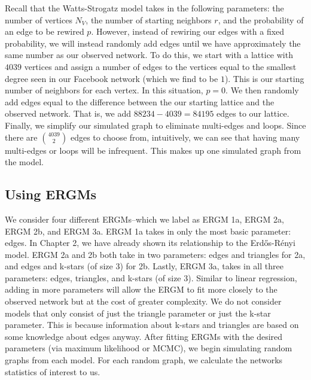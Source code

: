 \documentclass[12pt,twoside]{amherstthesis}
\begin{document}
  Recall that the Watts-Strogatz model takes in the following parameters:
  the number of vertices \(N_{V}\), the number of starting neighbors
  \(r\), and the probability of an edge to be rewired \(p\). However,
  instead of rewiring our edges with a fixed probability, we will instead
  randomly add edges until we have approximately the same number as our
  observed network. To do this, we start with a lattice with \(4039\)
  vertices and assign a number of edges to the vertices equal to the
  smallest degree seen in our Facebook network (which we find to be
  \(1\)). This is our starting number of neighbors for each vertex. In
  this situation, \(p = 0\). We then randomly add edges equal to the
  difference between the our starting lattice and the observed network.
  That is, we add \(88234 - 4039 = 84195\) edges to our lattice. Finally,
  we simplify our simulated graph to eliminate multi-edges and loops.
  Since there are \(4039 \choose 2\) edges to choose from, intuitively, we
  can see that having many multi-edges or loops will be infrequent. This
  makes up one simulated graph from the model.
  
  \subsection{Using ERGMs}\label{using-ergms}
  
  We consider four different ERGMs--which we label as ERGM 1a, ERGM 2a,
  ERGM 2b, and ERGM 3a. ERGM 1a takes in only the most basic parameter:
  edges. In Chapter 2, we have already shown its relationship to the
  Erdős-Rényi model. ERGM 2a and 2b both take in two parameters: edges and
  triangles for 2a, and edges and k-stars (of size 3) for 2b. Lastly, ERGM
  3a, takes in all three parameters: edges, triangles, and k-stars (of
  size 3). Similar to linear regression, adding in more parameters will
  allow the ERGM to fit more closely to the observed network but at the
  cost of greater complexity. We do not consider models that only consist
  of just the triangle parameter or just the k-star parameter. This is
  because information about k-stars and triangles are based on some
  knowledge about edges anyway. After fitting ERGMs with the desired
  parameters (via maximum likelihood or MCMC), we begin simulating random
  graphs from each model. For each random graph, we calculate the networks
  statistics of interest to us.
  
  \clearpage
  
\end{document}

